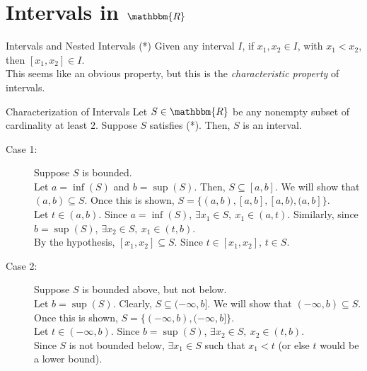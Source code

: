 \documentclass[10pt]{extarticle}
\newcommand{\R}{\mathbbm{R}}
\begin{document}
  \section{Intervals in $\R$}%
  \begin{problem}{Intervals and Nested Intervals}
    (*) Given any interval $I$, if $x_1,x_2\in I$, with $x_1 < x_2$, then $[x_1,x_2]\in I$.\\

    This seems like an obvious property, but this is the \textsl{characteristic property} of intervals.
    \begin{problem}{Characterization of Intervals}
      Let $S\in\R$ be any nonempty subset of cardinality at least $2$. Suppose $S$ satisfies (*). Then, $S$ is an interval.
      \tcblower
      \begin{description}
        \item[Case 1:] Suppose $S$ is bounded.\\

          Let $a = \inf(S)$ and $b = \sup(S)$. Then, $S \subseteq [a,b]$. We will show that $(a,b)\subseteq S$. Once this is shown, $S = \{(a,b), [a,b], [a,b), (a,b]\}$.\\

          Let $t\in (a,b)$. Since $a = \inf(S)$, $\exists x_1\in S,~x_1 \in (a,t)$. Similarly, since $b = \sup(S)$, $\exists x_2\in S,~x_1\in (t,b)$.\\

          By the hypothesis, $[x_1,x_2]\subseteq S$. Since $t\in [x_1,x_2]$, $t\in S$.
        \item[Case 2:] Suppose $S$ is bounded above, but not below.\\

          Let $b = \sup(S)$. Clearly, $S \subseteq (-\infty,b]$. We will show that $(-\infty,b)\subseteq S$. Once this is shown, $S = \{(-\infty,b), (-\infty,b]\}$.\\

          Let $t\in (-\infty,b)$. Since $b = \sup(S)$, $\exists x_2\in S,~x_2\in (t,b)$.\\

          Since $S$ is not bounded below, $\exists x_1\in S$ such that $x_1 < t$ (or else $t$ would be a lower bound).\\


\end{description}
\end{problem}
\end{problem}
\end{document}
